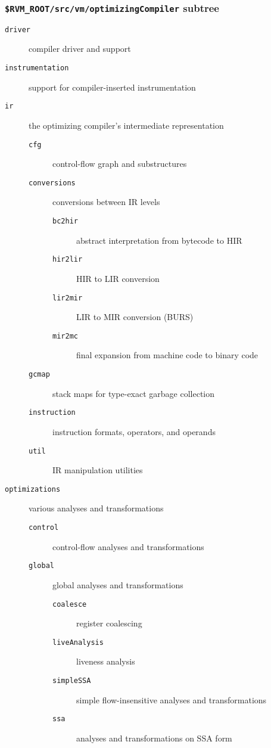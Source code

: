\subsubsection{{\tt \$RVM\_ROOT/src/vm/optimizingCompiler} subtree}
\begin{description}
\item [{\tt driver}] compiler driver and support
\item [{\tt instrumentation}] support for compiler-inserted instrumentation
\item [{\tt ir}] the optimizing compiler's intermediate representation
   \begin{description}
   \item [{\tt cfg}] control-flow graph and substructures
   \item [{\tt conversions}] conversions between IR levels
      \begin{description}
      \item [{\tt bc2hir}] abstract interpretation from bytecode to HIR
      \item [{\tt hir2lir}] HIR to LIR conversion
      \item [{\tt lir2mir}] LIR to MIR conversion (BURS)
      \item [{\tt mir2mc}] final expansion from machine code to binary code
      \end{description}
   \item [{\tt gcmap}] stack maps for type-exact garbage collection
   \item [{\tt instruction}] instruction formats, operators, and operands
   \item [{\tt util}] IR manipulation utilities
   \end{description}
\item [{\tt optimizations}] various analyses and transformations
   \begin{description}
   \item [{\tt control}] control-flow analyses and transformations
   \item [{\tt global}] global analyses and transformations 
      \begin{description}
      \item [{\tt coalesce}] register coalescing
      \item [{\tt liveAnalysis}] liveness analysis
      \item [{\tt simpleSSA}] simple flow-insensitive analyses and transformations
      \item [{\tt ssa}] analyses and transformations on SSA form

\end{description}
\end{description}
\end{description}
